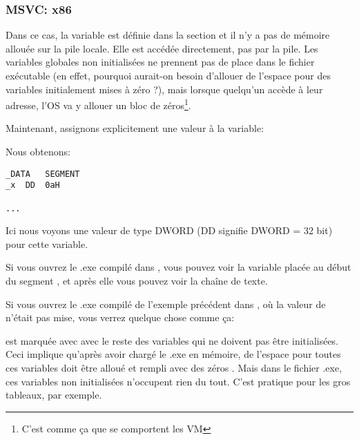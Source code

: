 \subsubsection{MSVC: x86}



Dans ce cas, la variable  est définie dans la section  et il n'y
a pas de mémoire allouée sur la pile locale. Elle est accédée directement, pas par
la pile.
Les variables globales non initialisées ne prennent pas de place dans le fichier
exécutable (en effet, pourquoi aurait-on besoin d'allouer de l'espace pour des variables
initialement mises à zéro ?), mais lorsque quelqu'un accède à leur adresse, l'\ac{OS}
va y allouer un bloc de zéros\footnote{C'est comme ça que se comportent les \ac{VM}}.

Maintenant, assignons explicitement une valeur à la variable:



Nous obtenons:

\begin{lstlisting}[style=customasmx86]
_DATA	SEGMENT
_x	DD	0aH

...
\end{lstlisting}

Ici nous voyons une valeur  de type DWORD (DD signifie DWORD = 32 bit) pour
cette variable.

Si vous ouvrez le .exe compilé dans \IDA, vous pouvez voir la variable  placée
au début du segment , et après elle vous pouvez voir la chaîne de texte.

Si vous ouvrez le .exe compilé de l'exemple précédent dans \IDA, où la valeur de
 n'était pas mise, vous verrez quelque chose comme ça:



 est marquée avec  avec le reste des variables qui ne doivent pas être
initialisées.
Ceci implique qu'après avoir chargé le .exe en mémoire, de l'espace pour toutes ces
variables doit être alloué et rempli avec des zéros .
Mais dans le fichier .exe, ces variables non initialisées n'occupent rien du tout.
C'est pratique pour les gros tableaux, par exemple.



